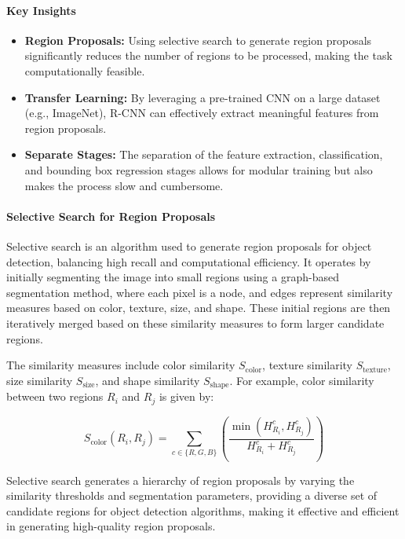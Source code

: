 \documentclass[12pt]{article}
\begin{document}
\paragraph{Key Insights}

\begin{itemize}
    \item \textbf{Region Proposals:} Using selective search to generate region proposals significantly reduces the number of regions to be processed, making the task computationally feasible.
    
    \item \textbf{Transfer Learning:} By leveraging a pre-trained CNN on a large dataset (e.g., ImageNet), R-CNN can effectively extract meaningful features from region proposals.

    \item \textbf{Separate Stages:} The separation of the feature extraction, classification, and bounding box regression stages allows for modular training but also makes the process slow and cumbersome.
\end{itemize}

\paragraph{Selective Search for Region Proposals}

Selective search is an algorithm used to generate region proposals for object detection, balancing high recall and computational efficiency. It operates by initially segmenting the image into small regions using a graph-based segmentation method, where each pixel is a node, and edges represent similarity measures based on color, texture, size, and shape. These initial regions are then iteratively merged based on these similarity measures to form larger candidate regions.

The similarity measures include color similarity \( S_{\text{color}} \), texture similarity \( S_{\text{texture}} \), size similarity \( S_{\text{size}} \), and shape similarity \( S_{\text{shape}} \). For example, color similarity between two regions \( R_i \) and \( R_j \) is given by:

\[
S_{\text{color}}(R_i, R_j) = \sum_{c \in \{R, G, B\}} \left( \frac{\min(H_{R_i}^c, H_{R_j}^c)}{H_{R_i}^c + H_{R_j}^c} \right)
\]

Selective search generates a hierarchy of region proposals by varying the similarity thresholds and segmentation parameters, providing a diverse set of candidate regions for object detection algorithms, making it effective and efficient in generating high-quality region proposals.
\end{document}
